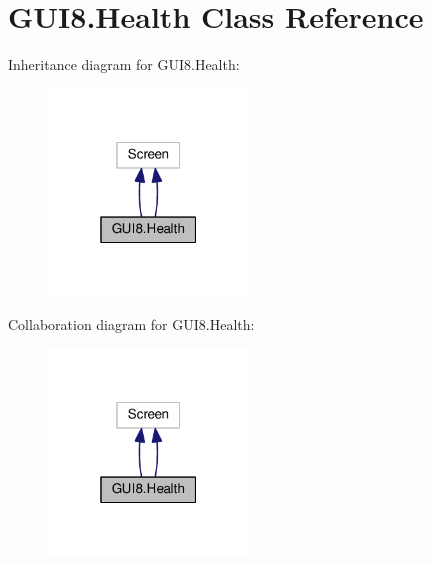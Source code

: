 \hypertarget{classGUI8_1_1Health}{}\section{G\+U\+I8.\+Health Class Reference}
\label{classGUI8_1_1Health}


Inheritance diagram for G\+U\+I8.\+Health\+:
\nopagebreak
\begin{figure}[H]
\begin{center}
\leavevmode
\includegraphics[width=151pt]{classGUI8_1_1Health__inherit__graph}
\end{center}
\end{figure}


Collaboration diagram for G\+U\+I8.\+Health\+:
\nopagebreak
\begin{figure}[H]
\begin{center}
\leavevmode
\includegraphics[width=151pt]{classGUI8_1_1Health__coll__graph}
\end{center}
\end{figure}
